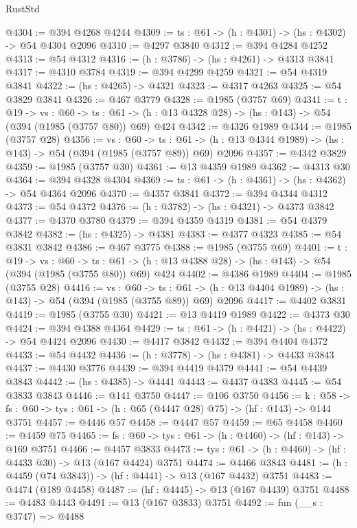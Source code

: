 \begin{lexlean}{RustStd}
\begin{coremodule}
{\begin{coremodule}
{{{{{{{{@4304 := @394 @4268 @4244
@4309 := {ts : @61} -> (h : @4301) -> (hs : @4302) -> @54 @4304 @2096
@4310 := @4297 @3840
@4312 := @394 @4284 @4252
@4313 := @54 @4312
@4316 := (h : @3786) -> (hs : @4261) -> @4313 @3841
@4317 := @4310 @3784
@4319 := @394 @4299 @4259
@4321 := @54 @4319 @3841
@4322 := (hs : @4265) -> @4321
@4323 := @4317 @4263
@4325 := @54 @3829 @3841
@4326 := @467 @3779
@4328 := @1985 (@3757 @69)
@4341 := {t : @19} ->
  {vs : @60} ->
  {ts : @61} -> (h : @13 @4328 @28) -> (hs : @143) -> @54 (@394 (@1985 (@3757 @80)) @69) @424
@4342 := @4326 @1989
@4344 := @1985 (@3757 @28)
@4356 := {vs : @60} ->
  {ts : @61} -> (h : @13 @4344 @1989) -> (hs : @143) -> @54 (@394 (@1985 (@3757 @89)) @69) @2096
@4357 := @4342 @3829
@4359 := @1985 (@3757 @30)
@4361 := @13 @4359 @1989
@4362 := @4313 @30
@4364 := @394 @4328 @4304
@4369 := {ts : @61} -> (h : @4361) -> (hs : @4362) -> @54 @4364 @2096
@4370 := @4357 @3841
@4372 := @394 @4344 @4312
@4373 := @54 @4372
@4376 := (h : @3782) -> (hs : @4321) -> @4373 @3842
@4377 := @4370 @3780
@4379 := @394 @4359 @4319
@4381 := @54 @4379 @3842
@4382 := (hs : @4325) -> @4381
@4383 := @4377 @4323
@4385 := @54 @3831 @3842
@4386 := @467 @3775
@4388 := @1985 (@3755 @69)
@4401 := {t : @19} ->
  {vs : @60} ->
  {ts : @61} -> (h : @13 @4388 @28) -> (hs : @143) -> @54 (@394 (@1985 (@3755 @80)) @69) @424
@4402 := @4386 @1989
@4404 := @1985 (@3755 @28)
@4416 := {vs : @60} ->
  {ts : @61} -> (h : @13 @4404 @1989) -> (hs : @143) -> @54 (@394 (@1985 (@3755 @89)) @69) @2096
@4417 := @4402 @3831
@4419 := @1985 (@3755 @30)
@4421 := @13 @4419 @1989
@4422 := @4373 @30
@4424 := @394 @4388 @4364
@4429 := {ts : @61} -> (h : @4421) -> (hs : @4422) -> @54 @4424 @2096
@4430 := @4417 @3842
@4432 := @394 @4404 @4372
@4433 := @54 @4432
@4436 := (h : @3778) -> (hs : @4381) -> @4433 @3843
@4437 := @4430 @3776
@4439 := @394 @4419 @4379
@4441 := @54 @4439 @3843
@4442 := (hs : @4385) -> @4441
@4443 := @4437 @4383
@4445 := @54 @3833 @3843
@4446 := @141 @3750
@4447 := @106 @3750
@4456 := {k : @58} ->
  {fs : @60} -> {tys : @61} -> (h : @65 (@4447 @28) @75) -> (hf : @143) -> @144 @3751
@4457 := @4446 @57
@4458 := @4447 @57
@4459 := @65 @4458
@4460 := @4459 @75
@4465 := {fs : @60} -> {tys : @61} -> (h : @4460) -> (hf : @143) -> @169 @3751
@4466 := @4457 @3833
@4473 := {tys : @61} -> (h : @4460) -> (hf : @4433 @30) -> @13 (@167 @4424) @3751
@4474 := @4466 @3843
@4481 := (h : @4459 (@74 @3843)) -> (hf : @4441) -> @13 (@167 @4432) @3751
@4483 := @4474 (@189 @4458)
@4487 := (hf : @4445) -> @13 (@167 @4439) @3751
@4488 := @4483 @4443
@4491 := @13 (@167 @3833) @3751
@4492 := fun (__s : @3747) => @4488
}}}}}}}}
\end{coremodule}}
\end{coremodule}
\end{lexlean}
